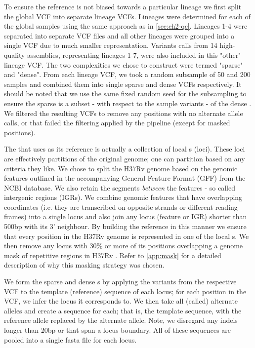 To ensure the reference \prg{} is not biased towards a particular lineage we first split the global \cryptic{} VCF into separate lineage VCFs. Lineages were determined for each of the global samples using the same approach as in \autoref{sec:ch2-qc}. Lineages 1-4 were separated into separate VCF files and all other lineages were grouped into a single VCF due to much smaller representation. Variants calls from 14 high-quality \mtb{} assemblies, representing lineages 1-7, were also included in this "other" lineage VCF. The two \prg{} complexities we chose to construct were termed "sparse" and "dense". From each lineage VCF, we took a random subsample of 50 and 200 samples and combined them into single sparse and dense VCFs respectively. It should be noted that we use the same fixed random seed for the subsampling to ensure the sparse \prg{} is a subset - with respect to the sample variants - of the dense \prg{}. We filtered the resulting VCFs to remove any positions with no alternate allele calls, or that failed the filtering applied by the \cryptic{} pipeline  (except for masked positions).  

The \prg{} that \pandora{} uses as its reference is actually a collection of local \prg{}s (loci). These loci are effectively partitions of the original genome; one can partition based on any criteria they like. We chose to split the H37Rv genome based on the genomic features outlined in the accompanying General Feature Format (GFF) from the NCBI database. We also retain the segments \emph{between} the features - so called intergenic regions (IGRs). We combine genomic features that have overlapping coordinates (i.e. they are transcribed on opposite strands or different reading frames) into a single locus and also join any locus (feature or IGR) shorter than 500bp with its 3' neighbour. By building the reference \prg{} in this manner we ensure that every position in the H37Rv genome is represented in one of the local \prg{}s. We then remove any locus with 30\% or more of its positions overlapping a genome mask of repetitive regions in H37Rv \cite{tbmask2014}. Refer to \autoref{app:mask} for a detailed description of why this masking strategy was chosen.

We form the sparse and dense \prg{}s by applying the variants from the respective VCF to the template (reference) sequence of each locus; for each position in the VCF, we infer the locus it corresponds to. We then take all (called) alternate alleles and create a sequence for each; that is, the template sequence, with the reference allele replaced by the alternate allele. Note, we disregard any indels longer than 20bp or that span a locus boundary. All of these sequences are pooled into a single fasta file for each locus. 

